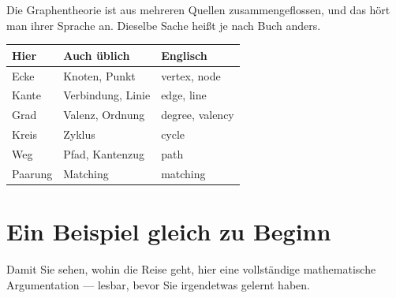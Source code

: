 \begin{warnung}
Die Graphentheorie ist aus mehreren Quellen zusammengeflossen, und das hört man ihrer Sprache an. Dieselbe Sache heißt je nach Buch anders.

\begin{center}
{\small
\renewcommand{\arraystretch}{1.42}
\begin{tabular}{@{}P{2.6cm}P{3.0cm}P{2.6cm}@{}}
\toprule
\textbf{Hier} & \textbf{Auch üblich} & \textbf{Englisch}\\
\midrule
Ecke & Knoten, Punkt & vertex, node\\
Kante & Verbindung, Linie & edge, line\\
Grad & Valenz, Ordnung & degree, valency\\
Kreis & Zyklus & cycle\\
Weg & Pfad, Kantenzug & path\\
Paarung & Matching & matching\\
\bottomrule
\end{tabular}}
\end{center}

\begin{center}
\begin{minipage}{0.88\textwidth}
\end{minipage}
\end{center}
\end{warnung}

\section*{Ein Beispiel gleich zu Beginn}

Damit Sie sehen, wohin die Reise geht, hier eine vollständige mathematische Argumentation --- lesbar, bevor Sie irgendetwas gelernt haben.

